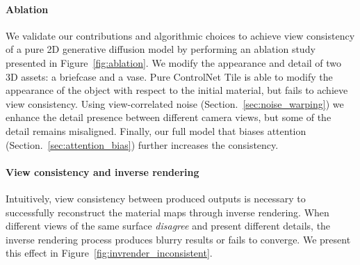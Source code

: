 

\paragraph{Ablation}
We validate our contributions and algorithmic choices to achieve view consistency of a pure 2D generative diffusion model by performing an ablation study presented in Figure~\ref{fig:ablation}.
We modify the appearance and detail of two 3D assets: a briefcase and a vase.
Pure ControlNet Tile is able to modify the appearance of the object with respect to the initial material, but fails to achieve view consistency.
Using view-correlated noise (Section.~\ref{sec:noise_warping}) we enhance the detail presence between different camera views, but some of the detail remains misaligned.
Finally, our full model that biases attention (Section.~\ref{sec:attention_bias}) further increases the consistency.

\paragraph{View consistency and inverse rendering}

Intuitively, view consistency between produced outputs is necessary to successfully reconstruct the material maps through inverse rendering.
When different views of the same surface \textit{disagree} and present different details, the inverse rendering process produces blurry results or fails to converge.
We present this effect in Figure~\ref{fig:invrender_inconsistent}.




